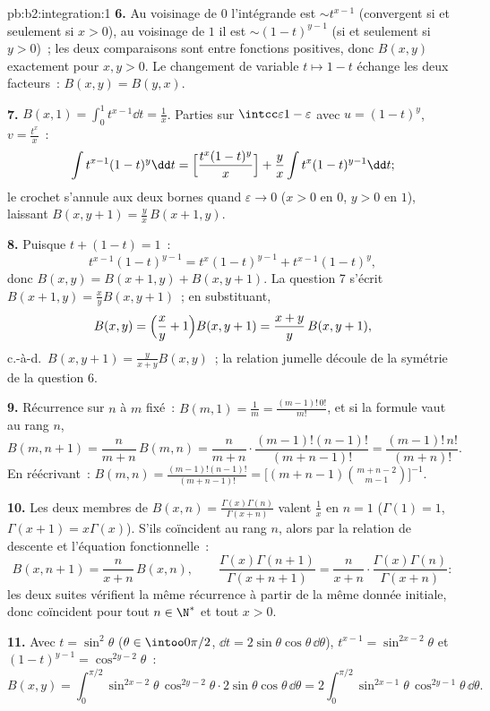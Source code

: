 \begin{solution}{pb:b2:integration:1}
\textbf{6.} Au voisinage de $0$ l'intégrande est $\sim t^{x-1}$
(convergent si et seulement si $x > 0$), au voisinage de $1$ il est $\sim (1-t)^{y-1}$
(si et seulement si $y > 0$)~; les deux comparaisons sont entre fonctions positives,
donc $B(x,y)$  exactement pour $x, y > 0$. Le changement de variable
$t \mapsto 1 - t$ échange les deux facteurs~: $B(x,y) = B(y,x)$.

\textbf{7.} $B(x,1) = \int_0^1 t^{x-1}\dd t = \frac1x$. Parties
sur $\intcc\varepsilon{1-\varepsilon}$ avec $u = (1-t)^y$, $v =
\frac{t^x}{x}$~:
\[
\int t^{x-1}(1-t)^{y}\dd t
= \Bigl[\frac{t^x(1-t)^y}{x}\Bigr]
+ \frac{y}{x}\int t^{x}(1-t)^{y-1}\dd t ;
\]
le crochet s'annule aux deux bornes quand $\varepsilon \to 0$ ($x >
0$ en $0$, $y > 0$ en $1$), laissant $B(x, y+1) = \frac
yx\,B(x+1, y)$.

\textbf{8.} Puisque $t + (1-t) = 1$~:
\[
t^{x-1}(1-t)^{y-1} = t^{x}(1-t)^{y-1} + t^{x-1}(1-t)^{y},
\]
donc $B(x,y) = B(x+1,y) + B(x,y+1)$. La question 7 s'écrit $B(x+1,y) =
\frac xy B(x,y+1)$~; en substituant,
\[
B(x,y) = \Bigl(\frac xy + 1\Bigr)B(x,y+1)
= \frac{x+y}{y}\,B(x,y+1),
\]
c.-à-d.\ $B(x,y+1) = \frac{y}{x+y}B(x,y)$~; la relation jumelle
découle de la symétrie de la question 6.

\textbf{9.} Récurrence sur $n$ à $m$ fixé~: $B(m,1) = \frac1m =
\frac{(m-1)!\,0!}{m!}$, et si la formule vaut au rang $n$,
\[
B(m, n+1) = \frac{n}{m+n}\,B(m,n)
= \frac{n}{m+n}\cdot\frac{(m-1)!(n-1)!}{(m+n-1)!}
= \frac{(m-1)!\,n!}{(m+n)!} .
\]
En réécrivant~: $B(m,n) = \frac{(m-1)!(n-1)!}{(m+n-1)!} =
\bigl[(m+n-1)\binom{m+n-2}{m-1}\bigr]^{-1}$.

\textbf{10.} Les deux membres de $B(x,n) =
\frac{\Gamma(x)\Gamma(n)}{\Gamma(x+n)}$ valent $\frac1x$ en $n =
1$ ($\Gamma(1) = 1$, $\Gamma(x+1) = x\Gamma(x)$). S'ils coïncident
au rang $n$, alors par la relation de descente et l'équation
fonctionnelle~:
\[
B(x, n+1) = \frac{n}{x+n}\,B(x,n), \qquad
\frac{\Gamma(x)\Gamma(n+1)}{\Gamma(x+n+1)}
= \frac{n}{x+n}\cdot
\frac{\Gamma(x)\Gamma(n)}{\Gamma(x+n)} :
\]
les deux suites vérifient la même récurrence à partir de la même
donnée initiale, donc coïncident pour tout $n \in \N^*$ et tout $x > 0$.

\textbf{11.} Avec $t = \sin^2\theta$ ($\theta \in
\intoo0{\pi/2}$, $\dd t = 2\sin\theta\cos\theta\,\dd\theta$),
$t^{x-1} = \sin^{2x-2}\theta$ et $(1-t)^{y-1} =
\cos^{2y-2}\theta$~:
\[
B(x,y) = \int_0^{\pi/2}\sin^{2x-2}\theta\,\cos^{2y-2}\theta
\cdot 2\sin\theta\cos\theta\,\dd\theta
= 2\int_0^{\pi/2}\sin^{2x-1}\theta\,\cos^{2y-1}\theta\,
\dd\theta .
\]


\end{solution}

